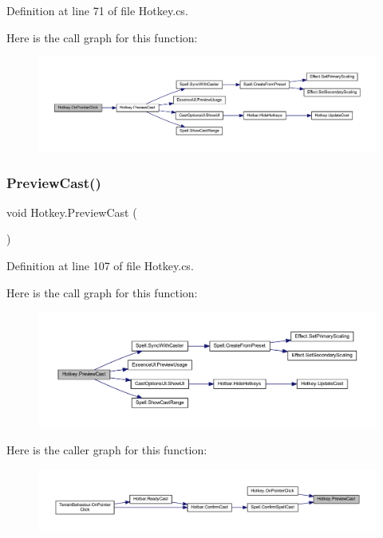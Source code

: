 Definition at line 71 of file Hotkey.\+cs.

Here is the call graph for this function\+:
\nopagebreak
\begin{figure}[H]
\begin{center}
\leavevmode
\includegraphics[width=350pt]{class_hotkey_a86ced9a614ad8d537fcab4738abcb0ef_cgraph}
\end{center}
\end{figure}
\mbox{\label{class_hotkey_a209f6726592cf69b7e21bd68ced48cb3}} 
\subsubsection{\texorpdfstring{PreviewCast()}{PreviewCast()}}
{\footnotesize\ttfamily void Hotkey.\+Preview\+Cast (\begin{DoxyParamCaption}{ }\end{DoxyParamCaption})}



Definition at line 107 of file Hotkey.\+cs.

Here is the call graph for this function\+:
\nopagebreak
\begin{figure}[H]
\begin{center}
\leavevmode
\includegraphics[width=350pt]{class_hotkey_a209f6726592cf69b7e21bd68ced48cb3_cgraph}
\end{center}
\end{figure}
Here is the caller graph for this function\+:
\nopagebreak
\begin{figure}[H]
\begin{center}
\leavevmode
\includegraphics[width=350pt]{class_hotkey_a209f6726592cf69b7e21bd68ced48cb3_icgraph}
\end{center}
\end{figure}
\mbox{\label{class_hotkey_ae8ab38a3ddf49344ede61f8fb67892c5}} 
